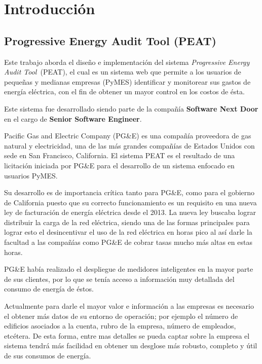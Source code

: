 \documentclass[letterpaper,twoside,openright]{book}
\begin{document}
\tableofcontents

\chapter{Introducción}
\section*{Progressive Energy Audit Tool (PEAT)}
Este trabajo aborda el diseño e implementación del sistema \textit{Progressive
  Energy Audit Tool}\ (PEAT), el cual es un sistema web que permite a los usuarios
de pequeñas y medianas empresas (PyMES) identificar y monitorear sus gastos
de energía eléctrica, con el fin de obtener un mayor control en los costos de ésta.

Este sistema fue desarrollado siendo parte de la compañía
\textbf{Software Next Door} en el cargo de \textbf{Senior Software Engineer}.

Pacific Gas and Electric Company (PG\&E) es una compañía proveedora de gas natural
y electricidad, una de las más grandes compañías de Estados Unidos con sede en
San Francisco, California. El sistema PEAT es el resultado de una licitación
iniciada por PG\&E para el desarrollo de un sistema enfocado en usuarios PyMES.

Su desarrollo es de importancia crítica tanto para PG\&E, como para el gobierno de
California puesto que su correcto funcionamiento es un requisito en una nueva
ley de facturación de energía eléctrica desde el 2013. La nueva ley buscaba
lograr distribuir la carga de la red eléctrica, siendo una de las formas
principales para lograr esto el desincentivar el uso de la red
eléctrica en horas pico al así darle la facultad a las compañías como PG\&E
de cobrar tasas mucho más altas en estas horas.

PG\&E había realizado el despliegue de medidores inteligentes en la
mayor parte de sus clientes, por lo que se tenía acceso a información
muy detallada del consumo de energía de éstos.

Actualmente para darle el mayor valor e información a las empresas es necesario
el obtener más datos de su entorno de operación; por ejemplo el número
de edificios asociados a la cuenta, rubro de la empresa, número
de empleados, etcétera. De esta forma, entre mas detalles se pueda captar sobre
la empresa el sistema tendrá más facilidad en obtener un desglose más robusto,
completo y útil de sus consumos de energía.

\mainmatter


\end{document}
